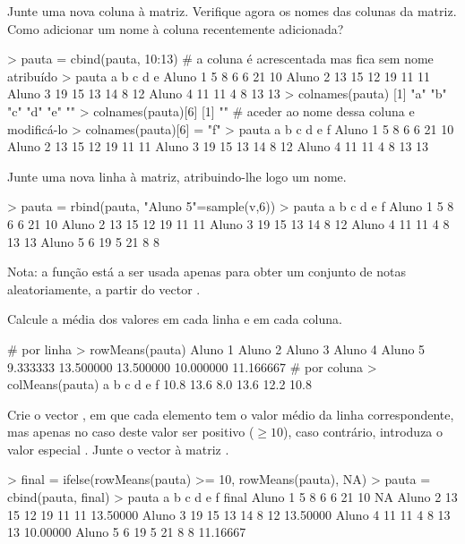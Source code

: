 \documentclass{exam}
\begin{document}
\begin{questions}
\question Junte uma nova coluna à matriz. Verifique agora os nomes das colunas da matriz. Como adicionar um nome à coluna recentemente adicionada?

\begin{solution}
	\begin{rcode}
		> pauta = cbind(pauta, 10:13)
		# a coluna é acrescentada mas fica sem nome atribuído
		> pauta
		         a  b  c  d  e   
		Aluno 1  5  8  6  6 21 10
		Aluno 2 13 15 12 19 11 11
		Aluno 3 19 15 13 14  8 12
		Aluno 4 11 11  4  8 13 13
		> colnames(pauta)
		[1] "a" "b" "c" "d" "e" "" 
		> colnames(pauta)[6]
		[1] ""
		# aceder ao nome dessa coluna e modificá-lo
		> colnames(pauta)[6] = "f"
		> pauta
		         a  b  c  d  e  f
		Aluno 1  5  8  6  6 21 10
		Aluno 2 13 15 12 19 11 11
		Aluno 3 19 15 13 14  8 12
		Aluno 4 11 11  4  8 13 13
	\end{rcode}
\end{solution}

\question Junte uma nova linha à matriz, atribuindo-lhe logo um nome.
\begin{solution}
	\begin{rcode}
		> pauta = rbind(pauta, "Aluno 5"=sample(v,6))
		> pauta
		         a  b  c  d  e  f
		Aluno 1  5  8  6  6 21 10
		Aluno 2 13 15 12 19 11 11
		Aluno 3 19 15 13 14  8 12
		Aluno 4 11 11  4  8 13 13
		Aluno 5  6 19  5 21  8  8
	\end{rcode}
	Nota: a função  está a ser usada apenas para obter um conjunto de notas aleatoriamente, a partir do vector .
\end{solution}

\question Calcule a média dos valores em cada linha e em cada coluna.
\begin{solution}
	\begin{rcode}
		# por linha
		> rowMeans(pauta)
		  Aluno 1   Aluno 2   Aluno 3   Aluno 4   Aluno 5 
		 9.333333 13.500000 13.500000 10.000000 11.166667 
		# por coluna
		> colMeans(pauta)
		   a    b    c    d    e    f 
		10.8 13.6  8.0 13.6 12.2 10.8 
	\end{rcode}
\end{solution}

\question Crie o vector , em que cada elemento tem o valor médio da linha correspondente, mas apenas no caso deste valor ser positivo ($\geq 10$), caso contrário, introduza o valor especial . Junte o vector  à matriz .
\begin{solution}
	\begin{rcode}
		> final = ifelse(rowMeans(pauta) >= 10, rowMeans(pauta), NA)
		> pauta = cbind(pauta, final)
		> pauta
		         a  b  c  d  e  f    final
		Aluno 1  5  8  6  6 21 10       NA
		Aluno 2 13 15 12 19 11 11 13.50000
		Aluno 3 19 15 13 14  8 12 13.50000
		Aluno 4 11 11  4  8 13 13 10.00000
		Aluno 5  6 19  5 21  8  8 11.16667
	\end{rcode}
\end{solution}


\end{questions}
\end{document}
